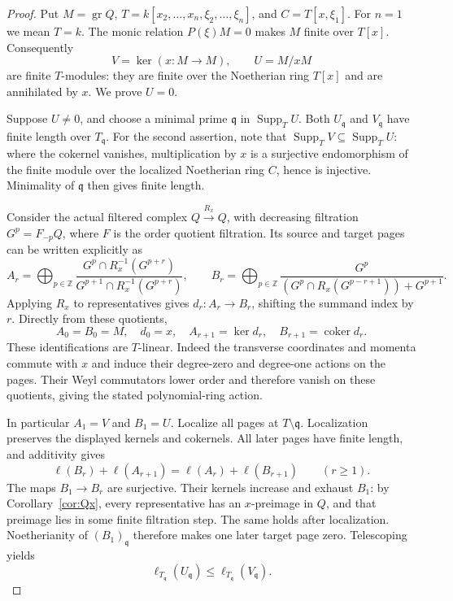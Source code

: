 \documentclass[11pt]{article}
\theoremstyle{plain}
\theoremstyle{definition}
\theoremstyle{remark}
\theoremstyle{plain}
\begin{document}
\begin{proof}
Put $M=\operatorname{gr}Q$, $T=k[x_2,\ldots,x_n,\xi_2,\ldots,\xi_n]$,
and $C=T[x,\xi_1]$. For $n=1$ we mean $T=k$.
The monic relation $P(\xi)M=0$ makes $M$ finite over $T[x]$.
Consequently
\[
 V=\ker(x:M\to M),\qquad U=M/xM
\]
are finite $T$-modules: they are finite over the Noetherian ring $T[x]$
and are annihilated by $x$. We prove $U=0$.

Suppose $U\ne0$, and choose a minimal prime $\mathfrak q$ in
$\operatorname{Supp}_T U$. Both $U_{\mathfrak q}$ and $V_{\mathfrak q}$
have finite length over $T_{\mathfrak q}$. For the second assertion, note
that $\operatorname{Supp}_T V\subseteq\operatorname{Supp}_T U$:
where the cokernel vanishes, multiplication by $x$ is a surjective
endomorphism of the finite module over the localized Noetherian ring $C$,
hence is injective. Minimality of $\mathfrak q$ then gives finite length.

Consider the actual filtered complex $Q\xrightarrow{R_x}Q$, with decreasing
filtration $G^p=F_{-p}Q$, where $F$ is the order quotient filtration.
Its source and target pages can be written explicitly as
\[
 A_r=\bigoplus_{p\in\mathbb Z}
 \frac{G^p\cap R_x^{-1}(G^{p+r})}
 {G^{p+1}\cap R_x^{-1}(G^{p+r})},\qquad
 B_r=\bigoplus_{p\in\mathbb Z}
 \frac{G^p}{(G^p\cap R_x(G^{p-r+1}))+G^{p+1}}.
\]
Applying $R_x$ to representatives gives $d_r:A_r\to B_r$, shifting
the summand index by $r$. Directly from these quotients,
\[
 A_0=B_0=M,\quad d_0=x,\quad
 A_{r+1}=\ker d_r,\quad B_{r+1}=\operatorname{coker}d_r.
\]
These identifications are $T$-linear. Indeed the transverse coordinates and
momenta commute with $x$ and induce their degree-zero and degree-one actions
on the pages. Their Weyl commutators lower order and therefore vanish on
these quotients, giving the stated polynomial-ring action.

In particular $A_1=V$ and $B_1=U$. Localize all pages at
$T\setminus\mathfrak q$. Localization preserves the displayed kernels
and cokernels. All later pages have finite length, and additivity gives
\[
 \ell(B_r)+\ell(A_{r+1})=\ell(A_r)+\ell(B_{r+1})\qquad(r\ge1).
\]
The maps $B_1\to B_r$ are surjective. Their kernels increase and exhaust
$B_1$: by Corollary~\ref{cor:Qx}, every representative has an
$x$-preimage in $Q$, and that preimage lies in some finite filtration step.
The same holds after localization. Noetherianity of $(B_1)_{\mathfrak q}$
therefore makes one later target page zero. Telescoping yields
\[
 \ell_{T_{\mathfrak q}}(U_{\mathfrak q})
 \le \ell_{T_{\mathfrak q}}(V_{\mathfrak q}).
\]


\end{proof}
\end{document}
